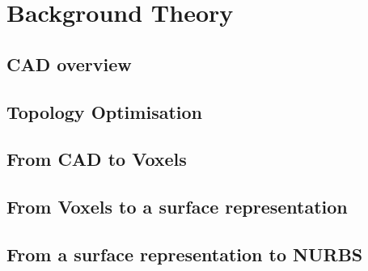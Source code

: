 \chapter{Background Theory}
\label{chapter:Background}

\section{CAD overview}


\section{Topology Optimisation}


\section{From CAD to Voxels}


\section{From Voxels to a surface representation}


\section{From a surface representation to NURBS}



